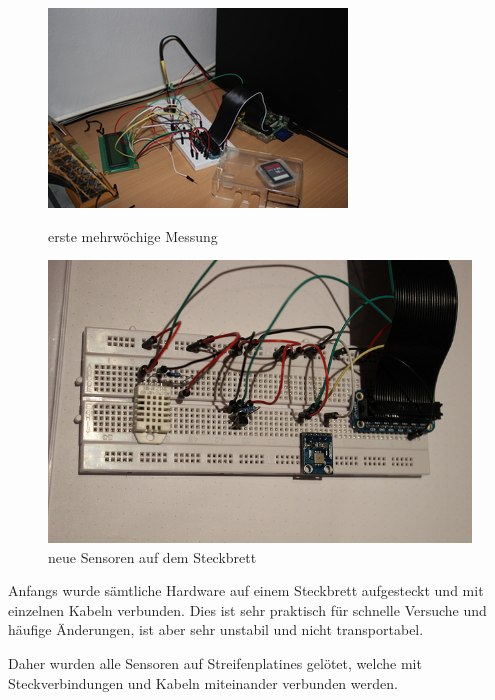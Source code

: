 \begin{figure}[h]
\begin{minipage}[b]{0.45\textwidth}
		\includegraphics[width=\textwidth]{figures/anschluss/1_3.jpg}
		\caption{erste mehrwöchige Messung}
	\end{minipage}\hfill
	\begin{minipage}[b]{0.45\textwidth}
		\centering
		\includegraphics[width=\textwidth]{figures/anschluss/1_4.jpg}
		\caption{neue Sensoren auf dem \gls{Steckbrett}}
	\end{minipage}
\end{figure}
Anfangs wurde sämtliche Hardware auf einem \gls{Steckbrett} aufgesteckt und mit einzelnen Kabeln verbunden. Dies ist sehr praktisch für schnelle Versuche und häufige Änderungen, ist aber sehr unstabil und nicht transportabel.

Daher wurden alle Sensoren auf \glspl{Streifenplatine} gelötet, welche mit Steckverbindungen und Kabeln miteinander verbunden werden.

